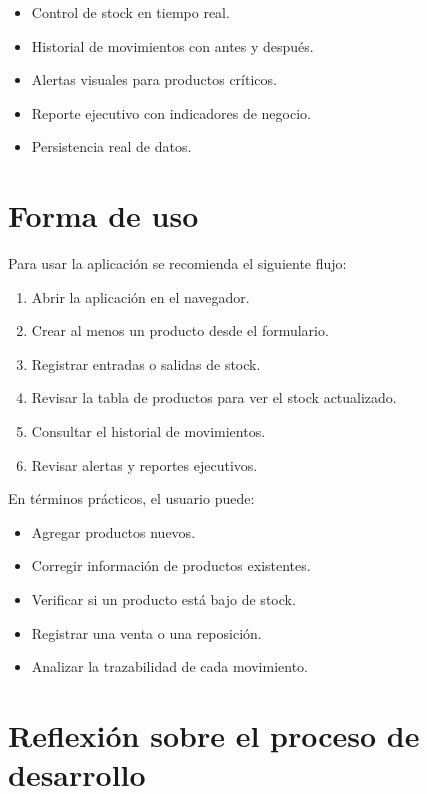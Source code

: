 \documentclass[12pt,a4paper]{article}
\begin{document}
\begin{itemize}[leftmargin=1.2cm]
    \item Control de stock en tiempo real.
    \item Historial de movimientos con antes y después.
    \item Alertas visuales para productos críticos.
    \item Reporte ejecutivo con indicadores de negocio.
    \item Persistencia real de datos.
\end{itemize}

\section{Forma de uso}

Para usar la aplicación se recomienda el siguiente flujo:

\begin{enumerate}[leftmargin=1.2cm]
    \item Abrir la aplicación en el navegador.
    \item Crear al menos un producto desde el formulario.
    \item Registrar entradas o salidas de stock.
    \item Revisar la tabla de productos para ver el stock actualizado.
    \item Consultar el historial de movimientos.
    \item Revisar alertas y reportes ejecutivos.
\end{enumerate}

En términos prácticos, el usuario puede:

\begin{itemize}[leftmargin=1.2cm]
    \item Agregar productos nuevos.
    \item Corregir información de productos existentes.
    \item Verificar si un producto está bajo de stock.
    \item Registrar una venta o una reposición.
    \item Analizar la trazabilidad de cada movimiento.
\end{itemize}

\section{Reflexión sobre el proceso de desarrollo}
\end{document}
